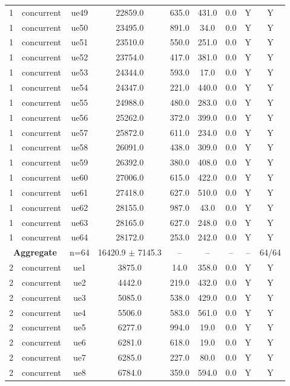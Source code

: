 \begin{table}[ht]
\begin{tabular}{|c|c|c|c|c|c|c|c|c|}
1 & concurrent & ue49 & 22859.0 & 635.0 & 431.0 & 0.0 & Y & Y \\
1 & concurrent & ue50 & 23495.0 & 891.0 & 34.0 & 0.0 & Y & Y \\
1 & concurrent & ue51 & 23510.0 & 550.0 & 251.0 & 0.0 & Y & Y \\
1 & concurrent & ue52 & 23754.0 & 417.0 & 381.0 & 0.0 & Y & Y \\
1 & concurrent & ue53 & 24344.0 & 593.0 & 17.0 & 0.0 & Y & Y \\
1 & concurrent & ue54 & 24347.0 & 221.0 & 440.0 & 0.0 & Y & Y \\
1 & concurrent & ue55 & 24988.0 & 480.0 & 283.0 & 0.0 & Y & Y \\
1 & concurrent & ue56 & 25262.0 & 372.0 & 399.0 & 0.0 & Y & Y \\
1 & concurrent & ue57 & 25872.0 & 611.0 & 234.0 & 0.0 & Y & Y \\
1 & concurrent & ue58 & 26091.0 & 438.0 & 309.0 & 0.0 & Y & Y \\
1 & concurrent & ue59 & 26392.0 & 380.0 & 408.0 & 0.0 & Y & Y \\
1 & concurrent & ue60 & 27006.0 & 615.0 & 422.0 & 0.0 & Y & Y \\
1 & concurrent & ue61 & 27418.0 & 627.0 & 510.0 & 0.0 & Y & Y \\
1 & concurrent & ue62 & 28155.0 & 987.0 & 43.0 & 0.0 & Y & Y \\
1 & concurrent & ue63 & 28165.0 & 627.0 & 248.0 & 0.0 & Y & Y \\
1 & concurrent & ue64 & 28172.0 & 253.0 & 242.0 & 0.0 & Y & Y \\
\multicolumn{2}{|c|}{\textbf{Aggregate}} & n=64 & 16420.9 $\pm$ 7145.3 & -- & -- & -- & -- & 64/64 \\
\hline
2 & concurrent & ue1 & 3875.0 & 14.0 & 358.0 & 0.0 & Y & Y \\
2 & concurrent & ue2 & 4442.0 & 219.0 & 432.0 & 0.0 & Y & Y \\
2 & concurrent & ue3 & 5085.0 & 538.0 & 429.0 & 0.0 & Y & Y \\
2 & concurrent & ue4 & 5506.0 & 583.0 & 561.0 & 0.0 & Y & Y \\
2 & concurrent & ue5 & 6277.0 & 994.0 & 19.0 & 0.0 & Y & Y \\
2 & concurrent & ue6 & 6281.0 & 618.0 & 19.0 & 0.0 & Y & Y \\
2 & concurrent & ue7 & 6285.0 & 227.0 & 80.0 & 0.0 & Y & Y \\
2 & concurrent & ue8 & 6784.0 & 359.0 & 594.0 & 0.0 & Y & Y \\

\end{tabular}
\end{table}
